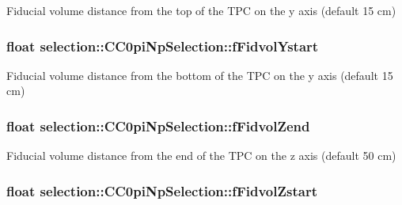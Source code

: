 Fiducial volume distance from the top of the T\-P\-C on the y axis (default 15 cm) \hypertarget{classselection_1_1CC0piNpSelection_ac59a66f695af8314018029e4480db16a}{
\subsubsection[{f\-Fidvol\-Ystart}]{\setlength{\rightskip}{0pt plus 5cm}float selection\-::\-C\-C0pi\-Np\-Selection\-::f\-Fidvol\-Ystart\hspace{0.3cm}{\ttfamily [private]}}}\label{classselection_1_1CC0piNpSelection_ac59a66f695af8314018029e4480db16a}
Fiducial volume distance from the bottom of the T\-P\-C on the y axis (default 15 cm) \hypertarget{classselection_1_1CC0piNpSelection_a9ac28bcb4ef95573d416dec35202b18e}{
\subsubsection[{f\-Fidvol\-Zend}]{\setlength{\rightskip}{0pt plus 5cm}float selection\-::\-C\-C0pi\-Np\-Selection\-::f\-Fidvol\-Zend\hspace{0.3cm}{\ttfamily [private]}}}\label{classselection_1_1CC0piNpSelection_a9ac28bcb4ef95573d416dec35202b18e}
Fiducial volume distance from the end of the T\-P\-C on the z axis (default 50 cm) \hypertarget{classselection_1_1CC0piNpSelection_afe5a2b82ecad103b98362839094c47e0}{
\subsubsection[{f\-Fidvol\-Zstart}]{\setlength{\rightskip}{0pt plus 5cm}float selection\-::\-C\-C0pi\-Np\-Selection\-::f\-Fidvol\-Zstart\hspace{0.3cm}{\ttfamily [private]}}}\label{classselection_1_1CC0piNpSelection_afe5a2b82ecad103b98362839094c47e0}
